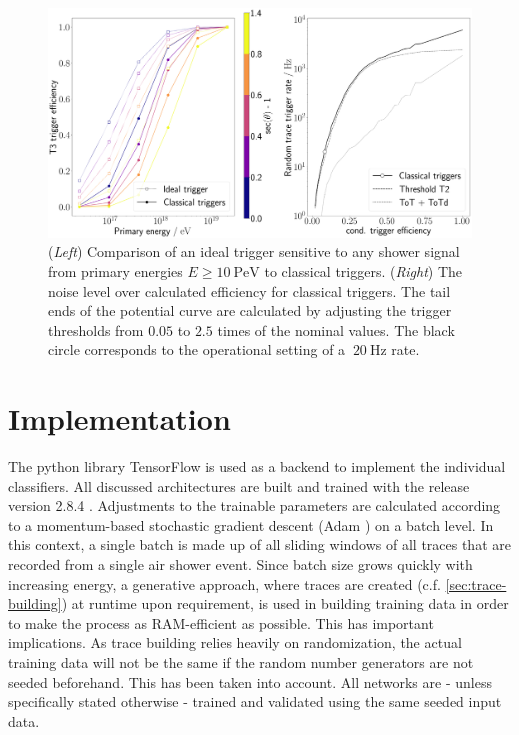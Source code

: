 \begin{figure}
	\centering
	\includegraphics[width=1\textwidth]{./plots/classical_triggers.png}
	\caption{(\textit{Left}) Comparison of an ideal trigger sensitive to any shower signal from primary energies $E\geq\SI{10}{\peta\electronvolt}$ to classical 
    triggers. (\textit{Right}) The noise level over calculated efficiency for classical triggers. The tail ends of the potential curve are calculated by adjusting 
	the trigger thresholds from $0.05$ to $2.5$ times of the nominal values. The black circle corresponds to the operational setting of a $~\SI{20}{\hertz}$ rate.}
	\label{fig:classical-trigger-performance}
\end{figure}

\section{Implementation}
\label{sec:implementation}

The python library TensorFlow \cite{tensorflow2015-whitepaper} is used as a backend to implement the individual classifiers. All discussed architectures are built 
and trained with the release version 2.8.4 \cite{tensorflowversion}. Adjustments to the trainable parameters are calculated according to a momentum-based 
stochastic gradient descent (Adam \cite{kingma2014adam}) on a batch level. In this context, a single batch is made up of all sliding windows of all traces that are
recorded from a single air shower event. Since batch size grows quickly with increasing energy, a generative approach, where traces are created 
(c.f. \autoref{sec:trace-building}) at runtime upon requirement, is used in building training data in order to make the process as RAM-efficient as possible. This 
has important implications. As trace building relies heavily on randomization, the actual training data will not be the same if the random number generators are 
not seeded beforehand. This has been taken into account. All networks are - unless specifically stated otherwise - trained and validated using the same seeded 
input data.

